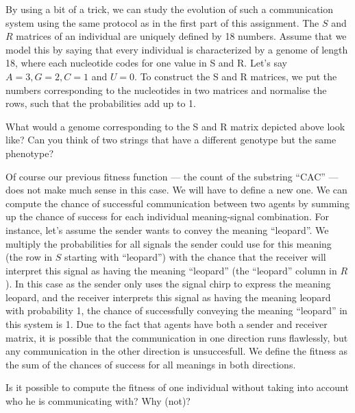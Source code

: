 \documentclass[a4paper, 9pt]{article}
\begin{document}

By using a bit of a trick, we can study the evolution of such a
communication system using the same protocol as in the first part of
this assignment. The $S$ and $R$ matrices of an individual are uniquely
defined by 18 numbers. Assume that we model this by saying that every
individual is characterized by a genome of length 18, where each
nucleotide codes for one value in S and R. Let's say $A=3, G=2, C=1$ and
$U=0$. To construct the S and R matrices, we put the numbers corresponding
to the nucleotides in two matrices and normalise the rows, such that the
probabilities add up to 1.

\begin{exercise}
\ask What would a genome corresponding to the S and R matrix depicted above look like?
\ask Can you think of two strings that have a different genotype but the same phenotype?
\end{exercise}

Of course our previous fitness function --- the count of the substring
``CAC'' --- does not make much sense in this case. We will have to define
a new one. We can compute the chance of successful communication between
two agents by summing up the chance of success for each individual
meaning-signal combination. For instance, let's assume the sender wants
to convey the meaning ``leopard''. We multiply the probabilities for all
signals the sender could use for this meaning (the row in $S$ starting
with ``leopard'') with the chance that the receiver will interpret this
signal as having the meaning ``leopard'' (the ``leopard'' column in
$R$). In this case as the sender only uses the signal chirp to express
the meaning leopard, and the receiver interprets this signal as having
the meaning leopard with probability 1, the chance of successfully
conveying the meaning ``leopard'' in this system is 1. Due to the fact
that agents have both a sender and receiver matrix, it is possible that
the communication in one direction runs flawlessly, but any
communication in the other direction is unsuccesfull. We define the
fitness as the sum of the chances of success for all meanings in both
directions.


\begin{exercise}
 \ask Is it possible to compute the fitness of one individual without taking into account who he is communicating with? Why (not)?
 \end{exercise}
\end{document}

